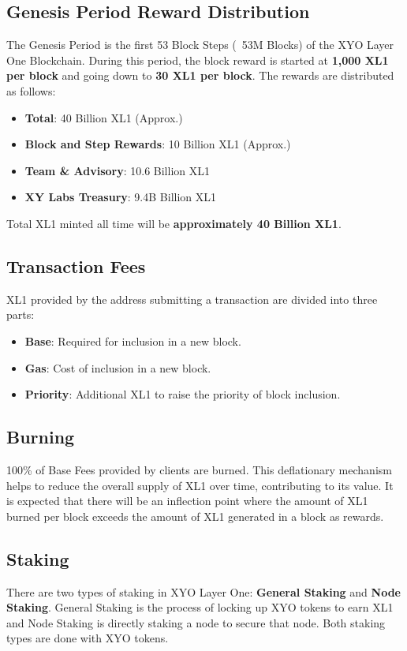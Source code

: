 \documentclass{article}
\begin{document}
\subsection{Genesis Period Reward Distribution}
The Genesis Period is the first 53 Block Steps (~53M Blocks) of the XYO Layer
One Blockchain. During this period, the block reward is started at
\textbf{1,000 XL1 per block} and going down to \textbf{30 XL1 per block}. The
rewards are distributed as follows:
\begin{itemize}
    \item \textbf{Total}: 40 Billion XL1 (Approx.)
    \item \textbf{Block and Step Rewards}: 10 Billion XL1 (Approx.)
    \item \textbf{Team \& Advisory}:  10.6 Billion XL1
    \item \textbf{XY Labs Treasury}: 9.4B Billion XL1
\end{itemize}

Total XL1 minted all time will be \textbf{approximately 40 Billion XL1}.

\subsection{Transaction Fees}
XL1 provided by the address submitting a transaction are divided into three
parts:
\begin{itemize}
    \item \textbf{Base}: Required for inclusion in a new block.
    \item \textbf{Gas}: Cost of inclusion in a new block.
    \item \textbf{Priority}: Additional XL1 to raise the priority of block inclusion.
\end{itemize}

\subsection{Burning}
100\% of Base Fees provided by clients are burned. This deflationary mechanism helps to reduce the overall supply of XL1 over time, contributing to its value. It is expected that there will be an inflection point where the amount of XL1 burned per block exceeds the amount of XL1 generated in a block as rewards.

\subsection{Staking}
There are two types of staking in XYO Layer One: \textbf{General Staking} and \textbf{Node Staking}.
General Staking is the process of locking up XYO tokens to earn XL1 and Node Staking is directly staking a node to secure that node.  Both staking types are done with XYO tokens.
\end{document}
